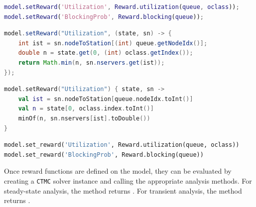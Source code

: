 \begin{MATLAB}
\begin{lstlisting}[language = matlab]
model.setReward('Utilization', Reward.utilization(queue, oclass));
model.setReward('BlockingProb', Reward.blocking(queue));
\end{lstlisting}
\end{MATLAB}
\begin{JAVA}
\begin{lstlisting}[language=java, basicstyle=\ttfamily\scriptsize]
model.setReward("Utilization", (state, sn) -> {
    int ist = sn.nodeToStation[(int) queue.getNodeIdx()];
    double n = state.get(0, (int) oclass.getIndex());
    return Math.min(n, sn.nservers.get(ist));
});
\end{lstlisting}
\end{JAVA}
\begin{KOTLIN}
\begin{lstlisting}[language=kotlin, basicstyle=\ttfamily\scriptsize]
model.setReward("Utilization") { state, sn ->
    val ist = sn.nodeToStation[queue.nodeIdx.toInt()]
    val n = state[0, oclass.index.toInt()]
    minOf(n, sn.nservers[ist].toDouble())
}
\end{lstlisting}
\end{KOTLIN}
\begin{PYTHON}
\begin{lstlisting}[language=python]
model.set_reward('Utilization', Reward.utilization(queue, oclass))
model.set_reward('BlockingProb', Reward.blocking(queue))
\end{lstlisting}
\end{PYTHON}

Once reward functions are defined on the model, they can be evaluated by creating a \texttt{CTMC} solver instance and calling the appropriate analysis methods. For steady-state analysis, the  method returns . For transient analysis, the  method returns .

